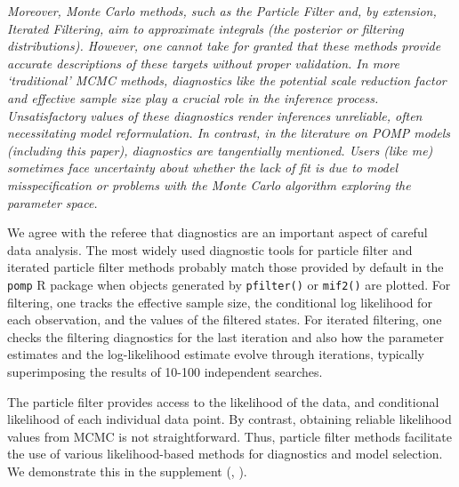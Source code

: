 \documentclass[11pt]{article}
\newcommand\code[1]{\texttt{#1}}
\newcommand\report[1]{{\color{mygreen} \vspace{1mm}\hspace{0.25in}\parbox{6in}{\em #1}}}
\begin{document}
\report{
Moreover, Monte Carlo methods, such as the Particle Filter and, by extension, Iterated Filtering, aim to approximate integrals (the posterior or filtering distributions). However, one cannot take for granted that these methods provide accurate descriptions of these targets without proper validation. In more ‘traditional’ MCMC methods, diagnostics like the potential scale reduction factor and effective sample size play a crucial role in the inference process. Unsatisfactory values of these diagnostics render inferences unreliable, often necessitating model reformulation. In contrast, in the literature on POMP models (including this paper), diagnostics are tangentially mentioned. Users (like me) sometimes face uncertainty about whether the lack of fit is due to model misspecification or problems with the Monte Carlo algorithm exploring the parameter space.
}

We agree with the referee that diagnostics are an important aspect of careful data analysis.
The most widely used diagnostic tools for particle filter and iterated particle filter methods probably match those provided by default in the \code{pomp} R package \cite{king16} when objects generated by \code{pfilter()} or \code{mif2()} are plotted.
For filtering, one tracks the effective sample size, the conditional log likelihood for each observation, and the values of the filtered states.
For iterated filtering, one checks the filtering diagnostics for the last iteration and also how the parameter estimates and the log-likelihood estimate evolve through iterations, typically superimposing the results of 10-100 independent searches.

The particle filter provides access to the likelihood of the data, and conditional likelihood of each individual data point.
By contrast, obtaining reliable likelihood values from MCMC is not straightforward.
Thus, particle filter methods facilitate the use of various likelihood-based methods for diagnostics and model selection.
We demonstrate this in the supplement (, ). 
\end{document}
